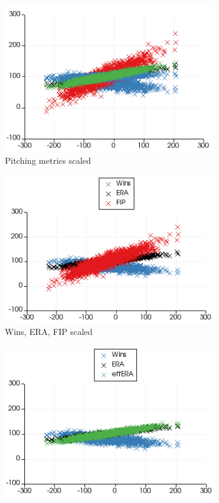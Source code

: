 \documentclass[12pt]{article}
\numberwithin{equation}{subsection}
\begin{document}
\begin{figure}[H] 
  \begin{subfigure}[b]{0.5\linewidth}
    \centering
    \includegraphics[width=0.9\linewidth]{similarpitch2} 
    \caption{Pitching metrics scaled} 
    \label{fig5:a} 
    \vspace{4ex}
  \end{subfigure}%
  \begin{subfigure}[b]{0.5\linewidth}
    \centering
    \includegraphics[width=0.9\linewidth]{similarpitch4} 
    \caption{Wins, ERA, FIP scaled} 
    \label{fig5:b} 
    \vspace{4ex}
  \end{subfigure} 
  \begin{subfigure}[b]{0.5\linewidth}
    \centering
    \includegraphics[width=0.9\linewidth]{similarpitch5} 

\end{subfigure}
\end{figure}
\end{document}
